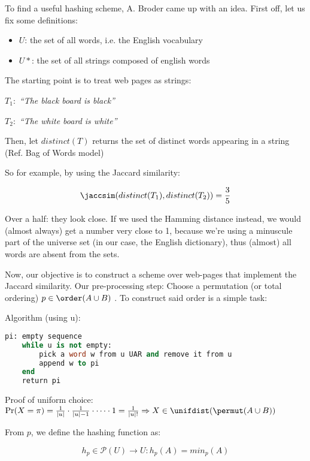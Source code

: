 	To find a useful hashing scheme, A. Broder came up with an idea. First off, let us fix some definitions:
	\begin{itemize}
	\item $U$: the set of all words, i.e. the English vocabulary
	\item $U*$: the set of all strings composed of english words
	\end{itemize}
	
	The starting point is to treat web pages as strings:
	
	$T_1:$ \textit{``The black board is black''}
	
	$T_2:$ \textit{``The white board is white''}
	
	Then, let $distinct(T)$ returns the set of distinct words appearing in a string (Ref. Bag of Words model)
	
	So for example, by using the Jaccard similarity:
    
    \begin{equation}
    \jaccsim(distinct(T_1), distinct(T_2))= \frac{3}{5}
    \end{equation}
	
	Over a half: they look close. If we used the Hamming distance instead, we would (almost always) get a number very close to 1, because we're using a minuscule part of the universe set (in our case, the English dictionary), thus (almost) all words are absent from the sets.
	
	Now, our objective is to construct a scheme over web-pages that implement the Jaccard similarity. Our pre-processing step: Choose a permutation (or total ordering) $p \in \order(A \cup B)$ \uar. To construct said order is a simple task:
	
	Algorithm (using u):
	
	\begin{lstlisting}[language=Pascal]
	pi: empty sequence
	while u is not empty:
		pick a word w from u UAR and remove it from u
		append w to pi
	end
	return pi
	\end{lstlisting}
	
	Proof of uniform choice: $\Pr(X = \pi) = \frac{1}{|u|}\cdot\frac{1}{|u|-1}\cdot\dots\cdot 1 = \frac{1}{|u|!} \Rightarrow X \in \unifdist(\permut(A \cup B))$
	
	From $p$, we define the hashing function as:
	
	\begin{equation}
	h_p \in \mathcal{P}(U) \to U : h_p(A) = min_p(A)
	\end{equation}
	
